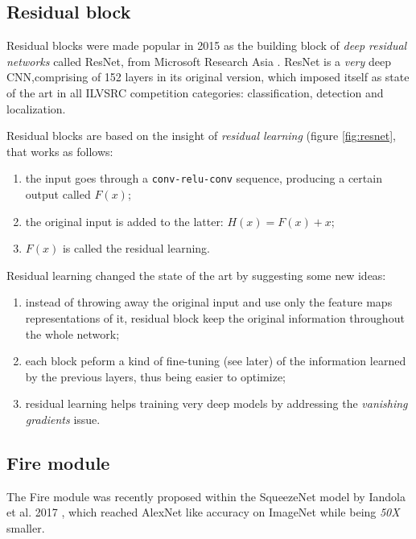 \subsection{Residual block}
Residual blocks were made popular in 2015 as the building block of \emph{deep residual networks} called ResNet, from Microsoft Research Asia \parencite{resnet}. ResNet is a \emph{very} deep CNN,comprising of 152 layers in its original version, which imposed itself as state of the art in all ILVSRC competition categories: classification, detection and localization. 
\newline 

Residual blocks are based on the insight of \emph{residual learning} (figure \ref{fig:resnet}, that works as follows: 
\begin{enumerate}
    \item the input goes through a \texttt{conv-relu-conv} sequence, producing a certain output called $F(x)$; 
    
    \item the original input is added to the latter: $H(x) = F(x) + x $; 
    
    \item $F(x)$ is called the residual learning. 
\end{enumerate}

Residual learning changed the state of the art by suggesting some new ideas: 
\begin{enumerate}
    \item instead of throwing away the original input and use only the feature maps representations of it, residual block keep the original information throughout the whole network; 
    
    \item each block peform a kind of fine-tuning (see later) of the information learned by the previous layers, thus being easier to optimize; 
    
    \item residual learning helps training very deep models by addressing the  \emph{vanishing gradients} issue. 
    
\end{enumerate}


\subsection{Fire module}
The Fire module was recently proposed within the SqueezeNet model by Iandola et al. 2017 \parencite{squeezenet}, which reached AlexNet like\parencite{AlexNet} accuracy on ImageNet while being \emph{50X} smaller. 

